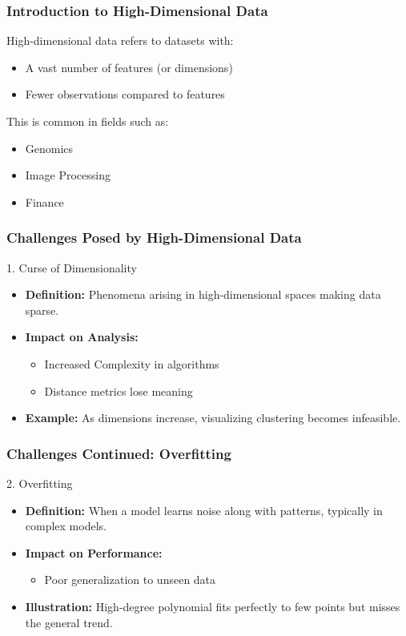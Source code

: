 \documentclass{beamer}
\begin{document}
\begin{frame}[fragile]
    \frametitle{Introduction to High-Dimensional Data}
    High-dimensional data refers to datasets with:
    \begin{itemize}
        \item A vast number of features (or dimensions)
        \item Fewer observations compared to features
    \end{itemize}
    This is common in fields such as:
    \begin{itemize}
        \item Genomics
        \item Image Processing
        \item Finance
    \end{itemize}
\end{frame}

\begin{frame}[fragile]
    \frametitle{Challenges Posed by High-Dimensional Data}
    \begin{block}{1. Curse of Dimensionality}
        \begin{itemize}
            \item \textbf{Definition:} Phenomena arising in high-dimensional spaces making data sparse.
            \item \textbf{Impact on Analysis:}
            \begin{itemize}
                \item Increased Complexity in algorithms
                \item Distance metrics lose meaning
            \end{itemize}
            \item \textbf{Example:} As dimensions increase, visualizing clustering becomes infeasible.
        \end{itemize}
    \end{block}
\end{frame}

\begin{frame}[fragile]
    \frametitle{Challenges Continued: Overfitting}
    \begin{block}{2. Overfitting}
        \begin{itemize}
            \item \textbf{Definition:} When a model learns noise along with patterns, typically in complex models.
            \item \textbf{Impact on Performance:}
            \begin{itemize}
                \item Poor generalization to unseen data
            \end{itemize}
            \item \textbf{Illustration:} High-degree polynomial fits perfectly to few points but misses the general trend.
        \end{itemize}
    \end{block}
\end{frame}
\end{document}
